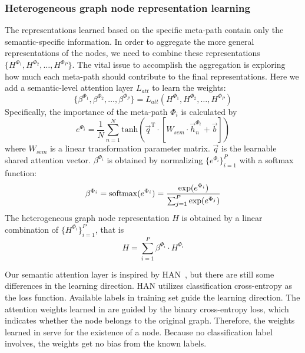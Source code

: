 \documentclass[conference]{IEEEtran}
\begin{document}
	\subsubsection{Heterogeneous graph node representation learning}
The representations learned based on the specific meta-path contain only the semantic-specific information.  In order to aggregate the more general representations of the nodes, we need to combine these representations $\{H^{\Phi_1}, H^{\Phi_2}, \dots, H^{\Phi_P}\}$.
	The vital issue to accomplish the aggregation is exploring how much each meta-path should contribute to the final representations. Here we add a semantic-level attention layer $L_{att}$ to learn the weights:
\begin{equation}
		\{\beta^{\Phi_1},\beta^{\Phi_2},\dots,\beta^{\Phi_P}\} = L_{att}(H^{\Phi_1}, H^{\Phi_2}, \dots, H^{\Phi_P})
		\label{eq:model}
\end{equation}
Specifically, the importance of the meta-path $\Phi_i$ is calculated by
\begin{equation}
		e^{\Phi_i} =\frac{1}{N} \sum_{n =1}^N \mathrm{tanh}(\vec{q}^{\mathrm{T}} \cdot [W_{sem}\cdot\vec{h}_n^{\Phi_i}+\vec{b}])
		\label{eq:importance}
	\end{equation}
where $W_{sem}$ is a linear transformation parameter matrix. $\vec{q}$ is the learnable shared attention vector. $\beta^{\Phi_i}$ is obtained by normalizing $\{e^{\Phi_i}\}_{i=1}^P$ with a softmax function:
\begin{equation}
		\beta^{\Phi_i} = \textup{softmax}(e^{\Phi_i}) = \frac{\mathrm{exp}(e^{\Phi_i})}{\sum_{j =1}^P \mathrm{exp}(e^{\Phi_j})}
	\end{equation}
The heterogeneous graph node representation $H$ is obtained by a linear combination of $\{H^{\Phi_i}\}_{i=1}^P$, that is 
\begin{equation}
		H = \sum_{i =1}^P \beta^{\Phi_i} \cdot H^{\Phi_i}
		\label{eq:embeddings}
	\end{equation}


Our semantic attention layer is inspired by HAN~\cite{WJSWCYY19}, but there are still some differences in the learning direction. HAN utilizes classification cross-entropy as the loss function. Available labels in training set guide the learning direction. The attention weights learned in {\our} are guided by the binary cross-entropy loss, which indicates whether the node belongs to the original graph. Therefore, the weights learned in {\our} serve for the existence of a node. Because no classification label involves, the weights get no bias from the known labels.
	
\end{document}
